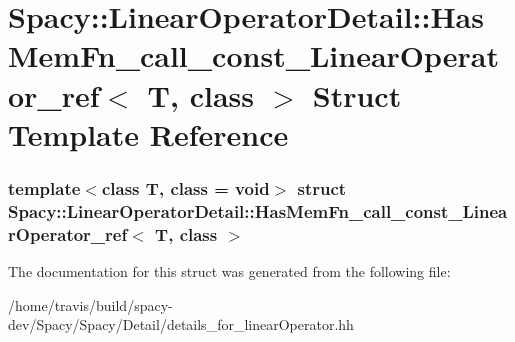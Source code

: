 \hypertarget{structSpacy_1_1LinearOperatorDetail_1_1HasMemFn__call__const__LinearOperator__ref}{\section{\-Spacy\-:\-:\-Linear\-Operator\-Detail\-:\-:\-Has\-Mem\-Fn\-\_\-call\-\_\-const\-\_\-\-Linear\-Operator\-\_\-ref$<$ \-T, class $>$ \-Struct \-Template \-Reference}
\label{structSpacy_1_1LinearOperatorDetail_1_1HasMemFn__call__const__LinearOperator__ref}
}
\subsubsection*{template$<$class T, class = void$>$ struct Spacy\-::\-Linear\-Operator\-Detail\-::\-Has\-Mem\-Fn\-\_\-call\-\_\-const\-\_\-\-Linear\-Operator\-\_\-ref$<$ T, class $>$}



\-The documentation for this struct was generated from the following file\-:\begin{DoxyCompactItemize}
\item 
/home/travis/build/spacy-\/dev/\-Spacy/\-Spacy/\-Detail/details\-\_\-for\-\_\-linear\-Operator.\-hh\end{DoxyCompactItemize}
